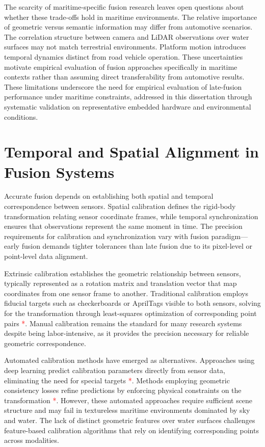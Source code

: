 \documentclass[../main.tex]{subfiles}
\begin{document}
The scarcity of maritime-specific fusion research leaves open questions about whether these trade-offs hold in maritime environments. The relative importance of geometric versus semantic information may differ from automotive scenarios. The correlation structure between camera and LiDAR observations over water surfaces may not match terrestrial environments. Platform motion introduces temporal dynamics distinct from road vehicle operation. These uncertainties motivate empirical evaluation of fusion approaches specifically in maritime contexts rather than assuming direct transferability from automotive results. These limitations underscore the need for empirical evaluation of late-fusion performance under maritime constraints, addressed in this dissertation through systematic validation on representative embedded hardware and environmental conditions.

\section{Temporal and Spatial Alignment in Fusion Systems}

Accurate fusion depends on establishing both spatial and temporal correspondence between sensors. Spatial calibration defines the rigid-body transformation relating sensor coordinate frames, while temporal synchronization ensures that observations represent the same moment in time. The precision requirements for calibration and synchronization vary with fusion paradigm—early fusion demands tighter tolerances than late fusion due to its pixel-level or point-level data alignment.

Extrinsic calibration establishes the geometric relationship between sensors, typically represented as a rotation matrix and translation vector that map coordinates from one sensor frame to another. Traditional calibration employs fiducial targets such as checkerboards or AprilTags visible to both sensors, solving for the transformation through least-squares optimization of corresponding point pairs \textcolor{red}{*}. Manual calibration remains the standard for many research systems despite being labor-intensive, as it provides the precision necessary for reliable geometric correspondence.

Automated calibration methods have emerged as alternatives. Approaches using deep learning predict calibration parameters directly from sensor data, eliminating the need for special targets \textcolor{red}{*}. Methods employing geometric consistency losses refine predictions by enforcing physical constraints on the transformation \textcolor{red}{*}. However, these automated approaches require sufficient scene structure and may fail in textureless maritime environments dominated by sky and water. The lack of distinct geometric features over water surfaces challenges feature-based calibration algorithms that rely on identifying corresponding points across modalities.
\end{document}
